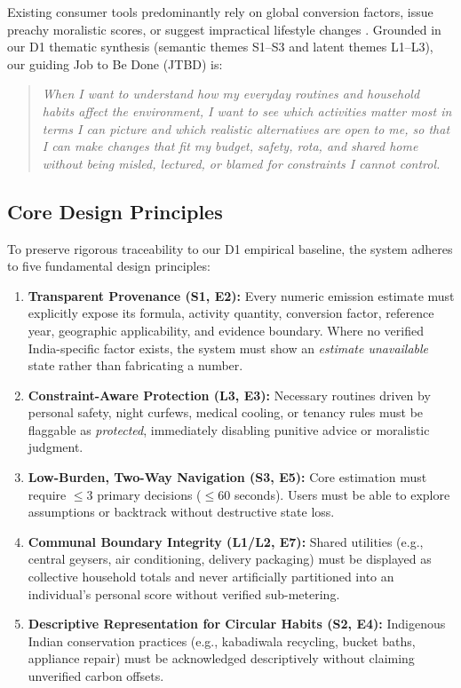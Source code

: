 \documentclass[12pt,a4paper]{article}
\begin{document}
Existing consumer tools predominantly rely on global conversion factors, issue preachy moralistic scores, or suggest impractical lifestyle changes \cite{brynjarsdottir2012}. Grounded in our D1 thematic synthesis (semantic themes S1--S3 and latent themes L1--L3), our guiding Job to Be Done (JTBD) is:
\begin{quote}
\itshape
When I want to understand how my everyday routines and household habits affect the environment, I want to see which activities matter most in terms I can picture and which realistic alternatives are open to me, so that I can make changes that fit my budget, safety, rota, and shared home without being misled, lectured, or blamed for constraints I cannot control.
\end{quote}

\subsection{Core Design Principles}
To preserve rigorous traceability to our D1 empirical baseline, the system adheres to five fundamental design principles:
\begin{enumerate}[label=\textbf{DP\arabic*.},leftmargin=*]
  \item \textbf{Transparent Provenance (S1, E2):} Every numeric emission estimate must explicitly expose its formula, activity quantity, conversion factor, reference year, geographic applicability, and evidence boundary. Where no verified India-specific factor exists, the system must show an \emph{estimate unavailable} state rather than fabricating a number.
  \item \textbf{Constraint-Aware Protection (L3, E3):} Necessary routines driven by personal safety, night curfews, medical cooling, or tenancy rules must be flaggable as \emph{protected}, immediately disabling punitive advice or moralistic judgment.
  \item \textbf{Low-Burden, Two-Way Navigation (S3, E5):} Core estimation must require $\le 3$ primary decisions ($\le 60$ seconds). Users must be able to explore assumptions or backtrack without destructive state loss.
  \item \textbf{Communal Boundary Integrity (L1/L2, E7):} Shared utilities (e.g., central geysers, air conditioning, delivery packaging) must be displayed as collective household totals and never artificially partitioned into an individual's personal score without verified sub-metering.
  \item \textbf{Descriptive Representation for Circular Habits (S2, E4):} Indigenous Indian conservation practices (e.g., kabadiwala recycling, bucket baths, appliance repair) must be acknowledged descriptively without claiming unverified carbon offsets.
\end{enumerate}
\end{document}
